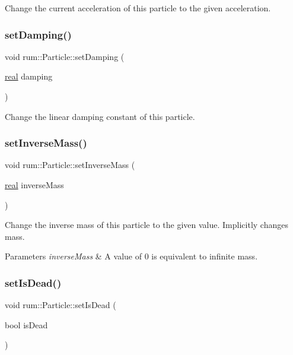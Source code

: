 Change the current acceleration of this particle to the given acceleration. \mbox{\label{classrum_1_1_particle_a79a5ff24e44cf8acee7d4a1928112d2b}} 
\subsubsection{\texorpdfstring{set\+Damping()}{setDamping()}}
{\footnotesize\ttfamily void rum\+::\+Particle\+::set\+Damping (\begin{DoxyParamCaption}\item[{\mbox{\hyperlink{namespacerum_a7e8cca23573d5eaead0f138cbaa4862c}{real}}}]{damping }\end{DoxyParamCaption})}

Change the linear damping constant of this particle. \mbox{\label{classrum_1_1_particle_a88699b6cd5b37767e0586d4d5a0162fa}} 
\subsubsection{\texorpdfstring{set\+Inverse\+Mass()}{setInverseMass()}}
{\footnotesize\ttfamily void rum\+::\+Particle\+::set\+Inverse\+Mass (\begin{DoxyParamCaption}\item[{\mbox{\hyperlink{namespacerum_a7e8cca23573d5eaead0f138cbaa4862c}{real}}}]{inverse\+Mass }\end{DoxyParamCaption})}

Change the inverse mass of this particle to the given value. Implicitly changes mass. 
\begin{DoxyParams}{Parameters}
{\em inverse\+Mass} & A value of 0 is equivalent to infinite mass. \\
\hline
\end{DoxyParams}
\mbox{\label{classrum_1_1_particle_a762d4b38f5557d3ce3f2020aab8cbd07}} 
\subsubsection{\texorpdfstring{set\+Is\+Dead()}{setIsDead()}}
{\footnotesize\ttfamily void rum\+::\+Particle\+::set\+Is\+Dead (\begin{DoxyParamCaption}\item[{bool}]{is\+Dead }\end{DoxyParamCaption})}

